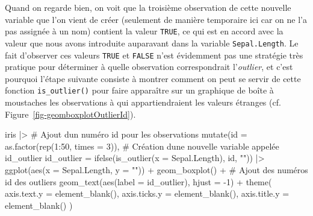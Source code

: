 \documentclass[
  letterpaper,
]{book}
\newenvironment{Shaded}{\begin{snugshade}}{\end{snugshade}}
\newcommand{\AttributeTok}[1]{\textcolor[rgb]{0.40,0.45,0.13}{#1}}
\newcommand{\CommentTok}[1]{\textcolor[rgb]{0.37,0.37,0.37}{#1}}
\newcommand{\DecValTok}[1]{\textcolor[rgb]{0.68,0.00,0.00}{#1}}
\newcommand{\FunctionTok}[1]{\textcolor[rgb]{0.28,0.35,0.67}{#1}}
\newcommand{\NormalTok}[1]{\textcolor[rgb]{0.00,0.23,0.31}{#1}}
\newcommand{\SpecialCharTok}[1]{\textcolor[rgb]{0.37,0.37,0.37}{#1}}
\newcommand{\StringTok}[1]{\textcolor[rgb]{0.13,0.47,0.30}{#1}}
\begin{document}
Quand on regarde bien, on voit que la troisième observation de cette
nouvelle variable que l'on vient de créer (seulement de manière
temporaire ici car on ne l'a pas assignée à un nom) contient la valeur
\texttt{TRUE}, ce qui est en accord avec la valeur que nous avons
introduite auparavant dans la variable \texttt{Sepal.Length}. Le fait
d'observer ces valeurs \texttt{TRUE} et \texttt{FALSE} n'est évidemment
pas une stratégie très pratique pour déterminer à quelle observation
correspondrait l'\emph{outlier}, et c'est pourquoi l'étape suivante
consiste à montrer comment on peut se servir de cette fonction
\texttt{is\_outlier()} pour faire apparaître sur un graphique de boîte à
moustaches les observations à qui appartiendraient les valeurs étranges
(cf. Figure~\ref{fig-geomboxplotOutlierId}).

\begin{Shaded}
\begin{Highlighting}[]
\NormalTok{iris }\SpecialCharTok{|\textgreater{}}
  \CommentTok{\# Ajout d\textquotesingle{}un numéro id pour les observations}
  \FunctionTok{mutate}\NormalTok{(}\AttributeTok{id =} \FunctionTok{as.factor}\NormalTok{(}\FunctionTok{rep}\NormalTok{(}\DecValTok{1}\SpecialCharTok{:}\DecValTok{50}\NormalTok{, }\AttributeTok{times =} \DecValTok{3}\NormalTok{)),}
         \CommentTok{\# Création d\textquotesingle{}une nouvelle variable appelée id\_outlier}
         \AttributeTok{id\_outlier =} \FunctionTok{ifelse}\NormalTok{(}\FunctionTok{is\_outlier}\NormalTok{(}\AttributeTok{x =}\NormalTok{ Sepal.Length), id, }\StringTok{""}\NormalTok{)) }\SpecialCharTok{|\textgreater{}}
  \FunctionTok{ggplot}\NormalTok{(}\FunctionTok{aes}\NormalTok{(}\AttributeTok{x =}\NormalTok{ Sepal.Length, }\AttributeTok{y =} \StringTok{""}\NormalTok{)) }\SpecialCharTok{+}
  \FunctionTok{geom\_boxplot}\NormalTok{() }\SpecialCharTok{+}
  \CommentTok{\# Ajout des numéros id des outliers}
  \FunctionTok{geom\_text}\NormalTok{(}\FunctionTok{aes}\NormalTok{(}\AttributeTok{label =}\NormalTok{ id\_outlier),  }\AttributeTok{hjust =} \SpecialCharTok{{-}}\DecValTok{1}\NormalTok{) }\SpecialCharTok{+}
  \FunctionTok{theme}\NormalTok{(}
    \AttributeTok{axis.text.y =} \FunctionTok{element\_blank}\NormalTok{(),}
    \AttributeTok{axis.ticks.y =} \FunctionTok{element\_blank}\NormalTok{(),}
    \AttributeTok{axis.title.y =} \FunctionTok{element\_blank}\NormalTok{()}
\NormalTok{  )}
\end{Highlighting}
\end{Shaded}
\end{document}
